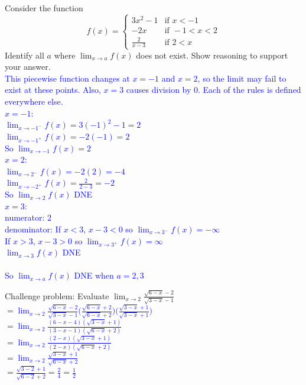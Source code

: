 \documentclass{ximera}
\begin{document}
\begin{exercise}
    Consider the function \[ f(x)=
    \begin{cases}
    3x^2-1 & \text{if }x<-1\\
    -2x & \text{if } -1<x<2\\
    \frac{2}{x-3} &\text{if } 2<x
    \end{cases}\]
    Identify all $a$ where $\displaystyle \lim_{x\rightarrow a} f(x)$ does not exist.  Show reasoning to support your answer.\\
    \textcolor{blue}{ This piecewise function changes at $x=-1$ and $x=2$, so the limit may fail to exist at these points. Also, $x=3$ causes division by 0.  Each of the rules is defined everywhere else.\\
$x=-1$:\\
$\displaystyle \lim_{x\rightarrow -1^-} f(x)=3(-1)^2-1=2$\\
$\displaystyle \lim_{x\rightarrow -1^+} f(x)=-2(-1)=2$\\
So $\displaystyle \lim_{x\rightarrow-1}f(x)=2$\\
$x=2$:\\
$\displaystyle \lim_{x\rightarrow 2^-} f(x)=-2(2)=-4$\\
$\displaystyle \lim_{x\rightarrow -2^+} f(x)=\frac{2}{2-3}=-2$\\
So $\displaystyle \lim_{x\rightarrow 2}f(x)$ DNE\\
$x=3$:\\
numerator: 2\\
denominator: If $x<3$, $x-3<0$ so $\displaystyle \lim_{x\rightarrow 3^-} f(x)=-\infty$\\
If $x>3$, $x-3>0$ so $\displaystyle \lim_{x\rightarrow 3^+}f(x)=\infty$\\
$\displaystyle \lim_{x\rightarrow 3} f(x)$ DNE\\
\\
So $\displaystyle \lim_{x\rightarrow a} f(x)$ DNE when $a=2,3$
}
\end{exercise}


\begin{exercise}

  Challenge problem: Evaluate $\displaystyle \lim_{x\rightarrow 2} \frac{\sqrt{6-x}-2}{\sqrt{3-x}-1} $\\
  \textcolor{blue}{ $=\displaystyle \lim_{x\rightarrow 2} \frac{\sqrt{6-x}-2}{\sqrt{3-x}-1}\bigg(\frac{\sqrt{6-x}+2}{\sqrt{6-x}+2}\bigg)\bigg(\frac{\sqrt{3-x}+1}{\sqrt{3-x}+1}\bigg)$\\
$=\displaystyle \lim_{x\rightarrow 2}\frac{(6-x-4)(\sqrt{3-x}+1)}{(3-x-1)(\sqrt{6-x}+2)}$\\
$=\displaystyle \lim_{x\rightarrow 2}\frac{(2-x)(\sqrt{3-x}+1)}{(2-x)(\sqrt{6-x}+2)}$\\
$=\displaystyle \lim_{x\rightarrow 2}\frac{\sqrt{3-x}+1}{\sqrt{6-x}+2}$\\
$\displaystyle =\frac{\sqrt{3-2}+1}{\sqrt{6-2}+2}=\frac{2}{4}=\frac12$}
     

\end{exercise}
\end{document}
